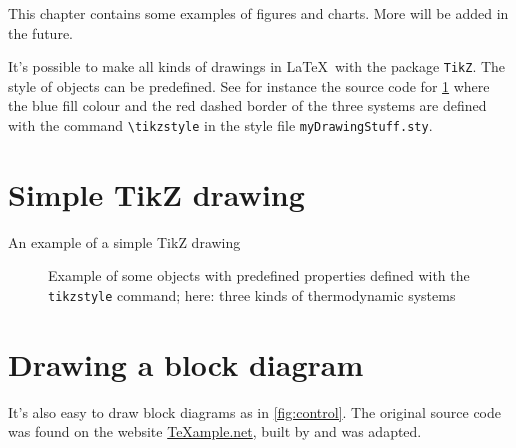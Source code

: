 \label{ch:drawing}
This chapter contains some examples of figures and charts. More will be added in the future.

It's possible to make all kinds of drawings in \LaTeX\ with the package \verb|TikZ|. The style of objects can be predefined. See for instance the source code for \cref{fig:3systems} where the blue fill colour and the red dashed border of the three systems are defined with the command \verb|\tikzstyle| in the style file \verb|myDrawingStuff.sty|.

\section{Simple TikZ drawing}

\begin{frame}{An example of a simple TikZ drawing}
    \begin{figure}[htbp]\centering
    	\caption{Example of some objects with predefined properties defined with the \texttt{tikzstyle} command; here: three kinds of thermodynamic systems}\label{fig:3systems}
    \end{figure}
\end{frame}

\section{Drawing a block diagram}
It's also easy to draw block diagrams as in \cref{fig:control}. The original source code was found on the website \href{www.texample.net/tikz/examples/control-system-principles}{TeXample.net}, built by \cite{texample} and was adapted.

